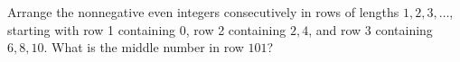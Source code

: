 Arrange the nonnegative even integers consecutively in rows of lengths $1,2,3,\ldots$, starting with row 1 containing $0$, row 2 containing $2,4$, and row 3 containing $6,8,10$. What is the middle number in row $101$?
